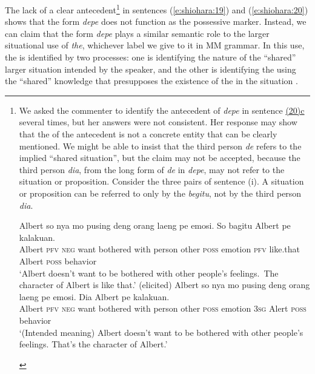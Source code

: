 \documentclass[output=paper
,modfonts
,nonflat]{langsci/langscibook}
\begin{document}
\noindent
The lack of a clear antecedent\footnote{We asked the commenter to identify the antecedent of \textit{depe} in sentence \hyperref[e:shiohara:20c]{(20)c} several times, but her answers were not consistent. Her response may show that the  of the antecedent is not a concrete entity that can be clearly mentioned. We might be able to insist that the third person  \textit{de} refers to the implied “shared situation”, but the claim may not be accepted, because the third person  \textit{dia}, from the long form of \textit{de} in \textit{depe}, may not refer to the situation or proposition. Consider the three pairs of sentence (i). A situation or proposition can be referred to only by the  \textit{begitu}, not by the third person  \textit{dia}.
\begin{exe}
	\ex\label{e:shiohara:footnote9}
	\begin{xlist}
		\ex\label{e:shiohara:footnote9a}
		\gll Albert  so  nya mo pusing deng orang laeng pe emosi. So  bagitu Albert  pe  kalakuan.\\
		Albert  \textsc{pfv}  \textsc{neg}  want  bothered  with  person  other  \textsc{poss}  emotion \textsc{pfv}  like.that	Albert  \textsc{poss}  behavior\\
		\glt ‘Albert doesn’t want to be bothered with other people's feelings.~The character of Albert is like that.’ \hfill (elicited)
		\ex\label{e:shiohara:footnote9b}
		\gll Albert  so  nya mo pusing deng orang laeng pe emosi. {\USStar}Dia  Albert  pe  kalakuan.\\
		Albert  \textsc{pfv}  \textsc{neg}  want  bothered  with  person  other  \textsc{poss}  emotion \phantom{*}3\textsc{sg}  Alert  \textsc{poss}  behavior\\
		‘(Intended meaning) Albert doesn’t want to be bothered with other people’s feelings. That’s the character of Albert.’
	\end{xlist}
\end{exe}} in sentences (\ref{e:shiohara:19}) and (\ref{e:shiohara:20}) shows that the form \textit{depe} does not function as the possessive marker. Instead, we can claim that the form \textit{depe} plays a similar semantic role to the larger situational use of \textit{the}, whichever label we give to it in MM grammar. In this use, the  is identified by two processes: one is identifying the nature of the “shared” larger situation intended by the speaker, and the other is identifying the  using the “shared” knowledge that presupposes the existence of the  in the situation \citep{Hawkins2015}.
\end{document}
